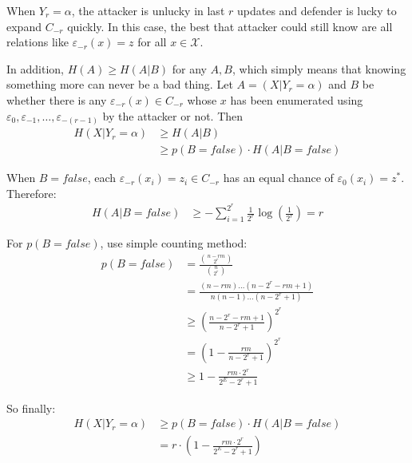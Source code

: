 \documentclass[10pt, conference, compsocconf]{IEEEtran}
\begin{document}
        \begin{IEEEproof}
            When $Y_r = \alpha$, the attacker
            is unlucky in last $r$ updates
            and defender is lucky
            to expand $C_{-r}$ quickly.
            In this case, the best that attacker
            could still know are all relations
            like $\varepsilon_{-r}(x) = z$ for all $x \in \mathcal X$.

            In addition, $H(A) \geq H(A|B)$ for
            any $A, B$, which simply means that knowing something
            more can never be a bad thing. Let $A = (X | Y_r = \alpha)$
            and $B$ be whether there is any $\varepsilon_{-r}(x) \in C_{-r}$ whose $x$
            has been enumerated using $\varepsilon_0, \varepsilon_{-1}, \ldots, \varepsilon_{-(r-1)}$
            by the attacker or not.
            Then
            \begin{align*}
                H(X | Y_r = \alpha) %
                    &\geq H(A | B)\\
                    &\geq p(B = false) \cdot H(A | B = false)
            \end{align*}

            When $B = false$, each $\varepsilon_{-r}(x_i) = z_i \in C_{-r}$
            has an equal chance of $\varepsilon_0(x_i) = z^*$. Therefore:
            \begin{align*}
                H(A | B = false) &\geq -\sum_{i = 1}^{2^r} \frac{1}{2^r} \log(\frac{1}{2^r})
                    = r
            \end{align*}

            For $p(B = false)$, use simple counting method:
            \begin{align*}
                p(B = false) &= \frac{\binom{n-r m}{2^r}}{\binom{n}{2^r}}\\
                    &= \frac{(n-r m)\ldots(n-2^r-r m+1)}{n(n-1)\ldots(n-2^r+1)}\\
                    &\geq (\frac{n-2^r-r m+1}{n-2^r+1})^{2^r}\\
                    &= (1-\frac{r m}{n-2^r+1})^{2^r}\\
                    &\geq 1-\frac{r m \cdot 2^r}{2^E-2^r+1}
            \end{align*}

            So finally:
            \begin{align*}
                H(X | Y_r = \alpha) &\geq p(B = false) \cdot H(A | B = false)\\
                    &= r \cdot (1-\frac{r m \cdot 2^r}{2^E-2^r+1})
            \end{align*}
        \end{IEEEproof}
\end{document}
